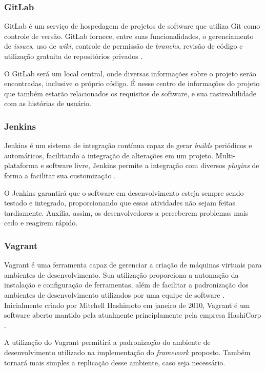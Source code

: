 \begin{apendicesenv}
\subsubsection{GitLab}
GitLab é um serviço de hospedagem de projetos de software que utiliza Git como controle de versão. GitLab fornece, entre suas funcionalidades, o gerenciamento de \textit{issues}, uso de \textit{wiki}, controle de permissão de \textit{branchs}, revisão de código e utilização gratuita de repositórios privados \cite{gitlab}.
\par
\indent O GitLab será um local central, onde diversas informações sobre o projeto serão encontradas, inclusive o próprio código. É nesse centro de informações do projeto que também estarão relacionados os requisitos de software, e sua rastreabilidade com as histórias de usuário.

\subsubsection{Jenkins}
Jenkins é um sistema de integração contínua capaz de gerar \textit{builds} periódicos e automáticos, facilitando a integração de alterações em um projeto. Multi-plataforma e software livre, Jenkins permite a integração com diversos \textit{plugins} de forma a facilitar sua customização \cite{jenkins2015}.
\par
\indent O Jenkins garantirá que o software em desenvolvimento esteja sempre sendo testado e integrado, proporcionando que essas atividades não sejam feitas tardiamente. Auxilia, assim, os desenvolvedores a perceberem problemas mais cedo e reagirem rápido.

\subsubsection{Vagrant}
Vagrant é uma ferramenta capaz de gerenciar a criação de máquinas virtuais para ambientes de desenvolvimento. Sua utilização proporciona a automação da instalação e configuração de ferramentas, além de facilitar a padronização dos ambientes de desenvolvimento utilizados por uma equipe de software \cite{vagrant2015}. Inicialmente criado por Mitchell Hashimoto em janeiro de 2010, Vagrant é um software aberto mantido pela atualmente principlamente pela empresa HashiCorp \cite{vagrant2015}. 

A utilização do Vagrant permitirá a padronização do ambiente de desenvolvimento utilizado na implementação do \textit{framework} proposto. Também tornará mais simples a replicação desse ambiente, caso seja necessário.


\end{apendicesenv}
